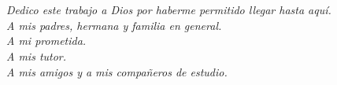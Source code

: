 \section*{}

\vfill
    \begin{flushright}
        \textit{
        Dedico este trabajo a Dios por haberme permitido llegar hasta aquí.\\
        A mis padres, hermana y familia en general.\\
        A mi prometida.\\
        A mis tutor.\\
        A mis amigos y a mis compañeros de estudio.
    }
\end{flushright}

\pagestyle{empty}